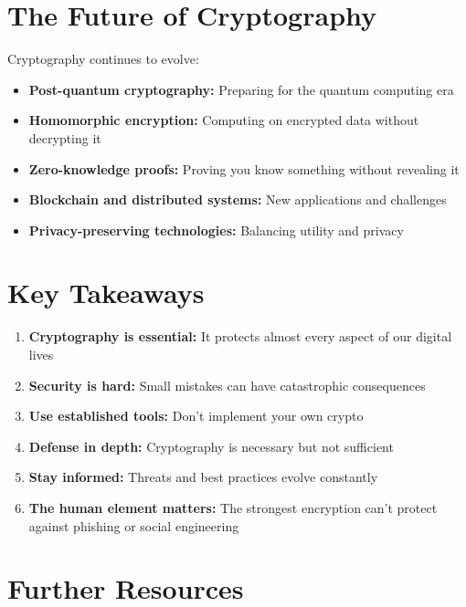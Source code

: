 \documentclass[11pt,a4paper]{report}
\begin{document}
\section{The Future of Cryptography}

Cryptography continues to evolve:

\begin{itemize}
\item \textbf{Post-quantum cryptography:} Preparing for the quantum computing era

\item \textbf{Homomorphic encryption:} Computing on encrypted data without decrypting it

\item \textbf{Zero-knowledge proofs:} Proving you know something without revealing it

\item \textbf{Blockchain and distributed systems:} New applications and challenges

\item \textbf{Privacy-preserving technologies:} Balancing utility and privacy
\end{itemize}

\section{Key Takeaways}

\begin{enumerate}
\item \textbf{Cryptography is essential:} It protects almost every aspect of our digital lives

\item \textbf{Security is hard:} Small mistakes can have catastrophic consequences

\item \textbf{Use established tools:} Don't implement your own crypto

\item \textbf{Defense in depth:} Cryptography is necessary but not sufficient

\item \textbf{Stay informed:} Threats and best practices evolve constantly

\item \textbf{The human element matters:} The strongest encryption can't protect against phishing or social engineering
\end{enumerate}

\section{Further Resources}
\end{document}
